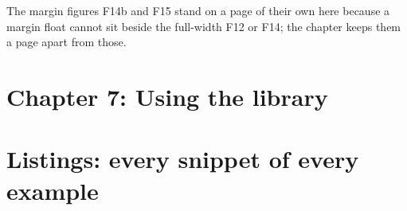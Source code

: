 \begin{marginfigure}
\centering

\caption{F15. Evaluations and relative error of Ridders for $\log x$ at $x = 2^{-k}$ against $k$: restarts cost
about two evaluations per halving; the budget is exhausted from $k = \valRiddersEdgeCapExponent$, ten correct digits
hold to $k = \valRiddersEdgeTenDigitsExponent$, a value is returned to $k = \valRiddersEdgeLimitExponent$ and the
result is non-finite beyond. Data .\label{fig:ridders-edge}}
\end{marginfigure}

The margin figures F14b and F15 stand on a page of their own here because a margin float cannot sit beside the
full-width F12 or F14; the chapter keeps them a page apart from those.

\clearpage
\section{Chapter 7: Using the library}

\begin{marginfigure}
\centering

\caption{F16. Newton's residual against the iteration for $T$ with $\enth(T) = H^\ast$ and a 
slope: quadratic convergence until rounding, \valNewtonIterations{} iterations from \SI{\valNewtonStart}{K}. Data
.\label{fig:newton}}
\end{marginfigure}

\begin{marginfigure}
\centering

\caption{F18. Relative error of ,  and Ridders (value and estimate) against the
distance of $x$ from the range break at \SI{\valKinkJunction}{K}, where the two published Shomate fits of nitrogen
do not meet and $\enth$ jumps by \SI{\valKinkJumpEnthalpy}{\joule\per\mole}. Inside a method's span the error of a
straddling stencil grows as $1/h$ whatever $\aorder$ (for a kink it would be $\order(1)$ or $\order(h)$), the rule
returns it without failing, and only Ridders' estimate shows it. Evaluable is not smooth: the estimate flags it, the
stencil does not. Data .\label{fig:kink}}
\end{marginfigure}

\clearpage
\section{Listings: every snippet of every example}

